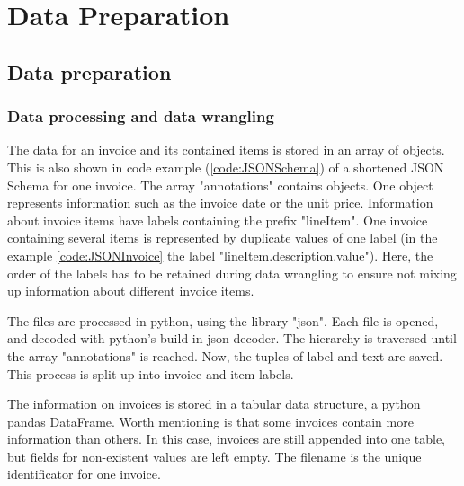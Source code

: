 \chapter{Data Preparation}

\section{Data preparation}


	\subsection{Data processing and data wrangling}
	
	The data for an invoice and its contained items is stored in an array of objects. This is also shown in code example (\ref{code:JSONSchema}) of a shortened JSON Schema for one invoice. The array "annotations" contains objects. One object represents information such as the invoice date or the unit price. 
	Information about invoice items have labels containing the prefix "lineItem". One invoice containing several items is represented by duplicate values of one label (in the example \ref{code:JSONInvoice} the label "lineItem.description.value"). Here, the order of the labels has to be retained during data wrangling to ensure not mixing up information about different invoice items.

	
	
	The files are processed in python, using the library "json". Each file is opened, and decoded with python's build in json decoder. The hierarchy is traversed until the array "annotations" is reached. Now, the tuples of label and text are saved. This process is split up into invoice and item labels.
	
	The information on invoices is stored in a tabular data structure, a python pandas DataFrame. Worth mentioning is that some invoices contain more information than others. In this case, invoices are still appended into one table, but fields for non-existent values are left empty. The filename is the unique identificator for one invoice.
	
